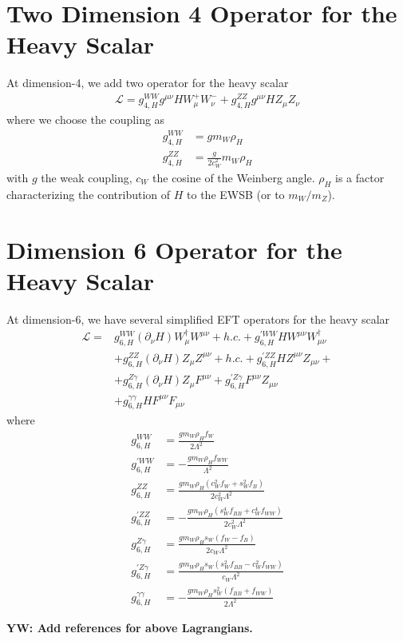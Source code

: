 \documentclass[aps,preprint,superscriptaddress,groupedaddress]{revtex4}  %
\newcommand{\ycwu}[1]{{\bf \color{red} YW: #1}}
\begin{document}
\section{Two Dimension 4 Operator for the Heavy Scalar}

At dimension-4, we add two operator for the heavy scalar
\begin{align}
    \mathcal{L} = g_{4,H}^{WW}g^{\mu\nu} H W^+_\mu W^-_\nu + g_{4,H}^{ZZ}g^{\mu\nu} H Z_\mu Z_\nu
\end{align}
where we choose the coupling as
\begin{align}
    g_{4,H}^{WW} &= g m_W \rho_H \\
    g_{4,H}^{ZZ} &= \frac{g}{2c_W^2} m_W \rho_H
\end{align}
with $g$ the weak coupling, $c_W$ the cosine of the Weinberg angle. $\rho_H$ is a factor characterizing the contribution of $H$ to the EWSB (or to $m_W/m_Z$).

\section{Dimension 6 Operator for the Heavy Scalar}

At dimension-6, we have several simplified EFT operators for the heavy scalar
\begin{align}
    \mathcal{L} =& g_{6,H}^{WW} (\partial_\nu H)W^{\dagger}_{\mu} W^{\mu\nu} + h.c. + g_{6,H}^{\prime WW} H W^{\mu\nu}W^\dagger_{\mu\nu} \nonumber \\
    & + g_{6,H}^{ZZ} (\partial_\nu H) Z_\mu Z^{\mu\nu} + h.c. + g_{6,H}^{\prime ZZ} H Z^{\mu\nu}Z_{\mu\nu} +\nonumber \\
    & + g_{6,H}^{Z\gamma} (\partial_\nu H) Z_\mu F^{\mu\nu} + g_{6,H}^{\prime Z\gamma} F^{\mu\nu}Z_{\mu\nu} \nonumber \\
    & + g_{6,H}^{\gamma\gamma} H F^{\mu\nu}F_{\mu\nu}
\end{align}
where
\begin{align}
    g_{6,H}^{WW} &= \frac{g m_W \rho_H f_W}{2\Lambda^2}\\
    g_{6,H}^{\prime WW} &= -\frac{g m_W \rho_H f_{WW}}{\Lambda^2} \\
    g_{6,H}^{ZZ} &=  \frac{g m_W \rho_H (c_W^2 f_W + s_W^2 f_B)}{2 c_W^2 \Lambda^2} \\
    g_{6,H}^{\prime ZZ} &= -\frac{g m_W \rho_H (s_W^4 f_{BB} + c_W^4 f_{WW})}{2 c_W^2 \Lambda^2} \\
    g_{6,H}^{Z\gamma} &= \frac{g m_W \rho_H s_W(f_W - f_B)}{2c_W\Lambda^2} \\
    g_{6,H}^{\prime Z\gamma} &= \frac{g m_W \rho_H s_W(s_W^2f_{BB}-c_W^2f_{WW})}{c_W \Lambda^2}\\
    g_{6,H}^{\gamma\gamma} &= -\frac{g m_W \rho_H s_W^2(f_{BB} + f_{WW})}{2\Lambda^2}
\end{align}

\ycwu{Add references for above Lagrangians.}

% 
\end{document}
